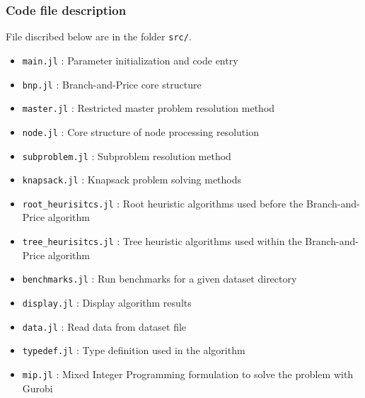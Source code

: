 \subsubsection{Code file description}
File discribed below are in the folder \texttt{src/}.
\begin{itemize}
	\item \texttt{main.jl} : Parameter initialization and code entry
	\item \texttt{bnp.jl} : Branch-and-Price core structure
	\item \texttt{master.jl} : Restricted master problem resolution method
	\item \texttt{node.jl} : Core structure of node processing resolution
	\item \texttt{subproblem.jl} : Subproblem resolution method
	\item \texttt{knapsack.jl} : Knapsack problem solving methods
	\item \texttt{root\_heurisitcs.jl} : Root heuristic algorithms used before the Branch-and-Price algorithm
	\item \texttt{tree\_heurisitcs.jl} : Tree heuristic algorithms used within the Branch-and-Price algorithm
	\item \texttt{benchmarks.jl} : Run benchmarks for a given dataset directory 
	\item \texttt{display.jl} : Display algorithm results
	\item \texttt{data.jl} : Read data from dataset file
	\item \texttt{typedef.jl} : Type definition used in the algorithm
	\item \texttt{mip.jl} : Mixed Integer Programming formulation to solve the problem with Gurobi
\end{itemize}


